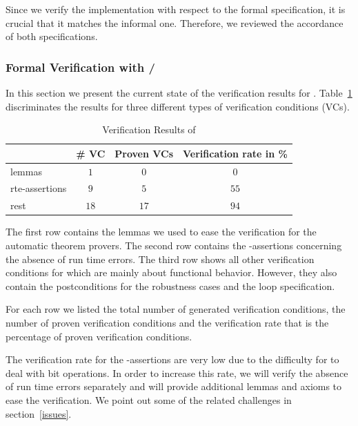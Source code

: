 Since we verify the implementation with respect to the formal specification, 
it is crucial that it matches the informal one. 
Therefore, we reviewed the accordance of both specifications.

\subsubsection{Formal Verification with \framac/\wpframac}
\label{verification-peek}

In this section we present the current state of the verification results 
for \peek.
Table~\ref{tab:results-peek} discriminates the results for
three different types of verification conditions (VCs).

\begin{table}[hbt]
  \centering
  \begin{tabular}[htb]{lccc}
    \toprule
     & \# VC & Proven VCs & Verification rate in \%\\
    \midrule
    lemmas & $1$ &$0$ & $0$ \\
    rte-assertions&$9$&$5$&$55$\\
    rest &$18$ &$17$&$94$\\
    \bottomrule
  \end{tabular}
  \caption{Verification Results of \peek}
  \label{tab:results-peek}
\end{table}


The first row contains the lemmas we used to ease the verification for the automatic theorem provers.
The second row contains the -assertions 
concerning the absence of run time errors.
The third row shows all other verification conditions for \peek
which are mainly about functional behavior.
However, they also contain the postconditions for the robustness cases
and the loop specification.

For each row we listed the total number of generated verification conditions,
the number of proven verification conditions and the verification rate
that is the percentage of proven verification conditions. 

The verification rate for the -assertions are very low 
due to the difficulty for \framac to deal with bit operations.
In order to increase this rate, we will verify the absence
of run time errors separately and will provide additional lemmas and axioms
to ease the verification.
We point out some of the related challenges in section~\ref{issues}.



